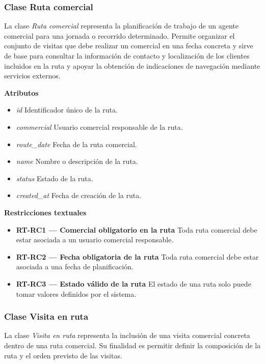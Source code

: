 \subsubsection{Clase Ruta comercial}

La clase \textit{Ruta comercial} representa la planificación de trabajo de un agente comercial para una jornada o recorrido determinado. Permite organizar el conjunto de visitas que debe realizar un comercial en una fecha concreta y sirve de base para consultar la información de contacto y localización de los clientes incluidos en la ruta y apoyar la obtención de indicaciones de navegación mediante servicios externos.

\textbf{Atributos}

\begin{itemize}
      \item \textit{id}
            Identificador único de la ruta.
      \item \textit{commercial}
            Usuario comercial responsable de la ruta.
      \item \textit{route\_date}
            Fecha de la ruta comercial.
      \item \textit{name}
            Nombre o descripción de la ruta.
      \item \textit{status}
            Estado de la ruta.
      \item \textit{created\_at}
            Fecha de creación de la ruta.
\end{itemize}

\textbf{Restricciones textuales}

\begin{itemize}
      \item \textbf{RT-RC1 — Comercial obligatorio en la ruta}
            Toda ruta comercial debe estar asociada a un usuario comercial responsable.
      \item \textbf{RT-RC2 — Fecha obligatoria de la ruta}
            Toda ruta comercial debe estar asociada a una fecha de planificación.
      \item \textbf{RT-RC3 — Estado válido de la ruta}
            El estado de una ruta solo puede tomar valores definidos por el sistema.
\end{itemize}

\subsubsection{Clase Visita en ruta}

La clase \textit{Visita en ruta} representa la inclusión de una visita comercial concreta dentro de una ruta comercial. Su finalidad es permitir definir la composición de la ruta y el orden previsto de las visitas.

